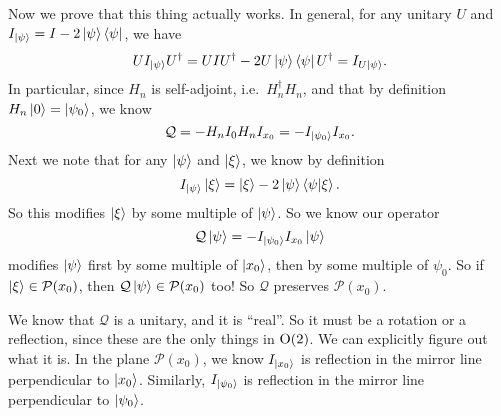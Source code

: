 Now we prove that this thing actually works. In general, for any unitary $U$ and $I_{\left\lvert \psi\right\rangle} = I - 2 \left\lvert \psi\right\rangle\left\langle \psi \right\rvert$, we have
\[
  UI_{\left\lvert \psi\right\rangle}U^\dagger = UIU^\dagger - 2U \left\lvert \psi\right\rangle \left\langle \psi \right\rvert U^\dagger = I_{U \left\lvert \psi\right\rangle}.
\]
In particular, since $H_n$ is self-adjoint, i.e.\ $H_n^\dagger H_n$, and that by definition $H_n \left\lvert 0\right\rangle = \left\lvert \psi_0\right\rangle$, we know
\[
  \mathcal{Q} = -H_n I_0 H_n I_{x_0} = -I_{\left\lvert \psi_0\right\rangle} I_{x_0}.
\]
Next we note that for any $\left\lvert \psi\right\rangle$ and $\left\lvert \xi\right\rangle$, we know by definition
\[
  I_{\left\lvert \psi\right\rangle}\left\lvert \xi\right\rangle = \left\lvert \xi\right\rangle - 2 \left\lvert \psi\right\rangle \left\langle \psi\middle\vert \xi \right\rangle.
\]
So this modifies $\left\lvert \xi\right\rangle$ by some multiple of $\left\lvert \psi\right\rangle$. So we know our operator
\[
  \mathcal{Q}\left\lvert \psi\right\rangle = -I_{\left\lvert \psi_0\right\rangle} I_{x_0}\left\lvert \psi\right\rangle
\]
modifies $\left\lvert \psi\right\rangle$ first by some multiple of $\left\lvert x_0\right\rangle$, then by some multiple of $\psi_0$. So if $\left\lvert \xi\right\rangle \in \mathcal{P}(x_0)$, then $\mathcal{Q} \left\lvert \psi\right\rangle \in \mathcal{P}(x_0)$ too! So $\mathcal{Q}$ preserves $\mathcal{P}(x_0)$.

We know that $\mathcal{Q}$ is a unitary, and it is ``real''. So it must be a rotation or a reflection, since these are the only things in $\mathrm{O}(2)$. We can explicitly figure out what it is. In the plane $\mathcal{P}(x_0)$, we know $I_{\left\lvert x_0\right\rangle}$ is reflection in the mirror line perpendicular to $\left\lvert x_0\right\rangle$. Similarly, $I_{\left\lvert \psi_0\right\rangle}$ is reflection in the mirror line perpendicular to $\left\lvert \psi_0\right\rangle$.

